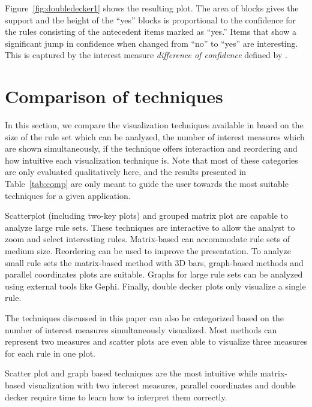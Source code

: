 \documentclass[nojss]{jss}
\begin{document}
Figure~\ref{fig:doubledecker1} shows the resulting plot.
The area of blocks gives the support and the height of the ``yes'' blocks is
proportional to the confidence for the rules consisting of the antecedent items
marked as ``yes.''
Items that show a significant jump in confidence when changed from
``no'' to ``yes'' are interesting. This is captured
by the interest measure \emph{difference of confidence} defined by
\cite{arulesViz:Hofmann:2001}.


\section{Comparison of techniques}
\label{sec:comp}

In this section, we compare the visualization techniques
available in 
based on the size of the rule set
which can be analyzed, the number of interest measures which are shown
simultaneously,
if the technique offers interaction and reordering
and how intuitive each visualization technique is. Note that most of these
categories are only evaluated qualitatively here, and the results
presented in Table~\ref{tab:comp}
are only meant to guide the user towards the most suitable techniques for
a given application.

Scatterplot (including two-key plots) and grouped matrix plot are capable to
analyze large rule sets. These techniques are interactive to allow
the analyst to zoom and select interesting rules. Matrix-based
can accommodate rule sets of medium size. Reordering can be used to improve
the presentation.
To analyze small rule sets the matrix-based method with 3D bars,
graph-based methods and parallel coordinates
plots are suitable. Graphs for large rule sets can be analyzed using
external tools like Gephi.
Finally, double decker plots only visualize a single rule.

The techniques discussed in this paper can also be
categorized based on the number of interest measures simultaneously
visualized. Most methods can represent two measures and scatter plots
are even able to visualize three measures for each rule in one plot.

Scatter plot and graph based techniques are the most intuitive while
matrix-based visualization with two interest measures, parallel coordinates
and double decker require time to learn how to interpret them correctly.

\end{document}
